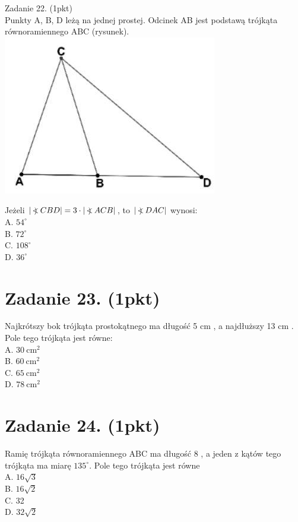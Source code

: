 \documentclass[10pt]{article}
\newcommand\Varangle{\mathop{{<\!\!\!\!\!\text{\small)}}\:}\nolimits}
\begin{document}
Zadanie 22. (1pkt)\\
Punkty A, B, D leżą na jednej prostej. Odcinek AB jest podstawą trójkąta równoramiennego ABC (rysunek).\\
\includegraphics[max width=\textwidth, center]{2024_11_21_a68a2ba4fc31c5fb438eg-06(1)}

Jeżeli \(|\Varangle C B D|=3 \cdot|\Varangle A C B|\), to \(|\Varangle D A C|\) wynosi:\\
A. \(54^{\circ}\)\\
B. \(72^{\circ}\)\\
C. \(108^{\circ}\)\\
D. \(36^{\circ}\)

\section*{Zadanie 23. (1pkt)}
Najkrótszy bok trójkąta prostokątnego ma długość 5 cm , a najdłuższy 13 cm . Pole tego trójkąta jest równe:\\
A. \(30 \mathrm{~cm}^{2}\)\\
B. \(60 \mathrm{~cm}^{2}\)\\
C. \(65 \mathrm{~cm}^{2}\)\\
D. \(78 \mathrm{~cm}^{2}\)

\section*{Zadanie 24. (1pkt)}
Ramię trójkąta równoramiennego ABC ma długość 8 , a jeden z kątów tego trójkąta ma miarę \(135^{\circ}\). Pole tego trójkąta jest równe\\
A. \(16 \sqrt{3}\)\\
B. \(16 \sqrt{2}\)\\
C. 32\\
D. \(32 \sqrt{2}\)
\end{document}
